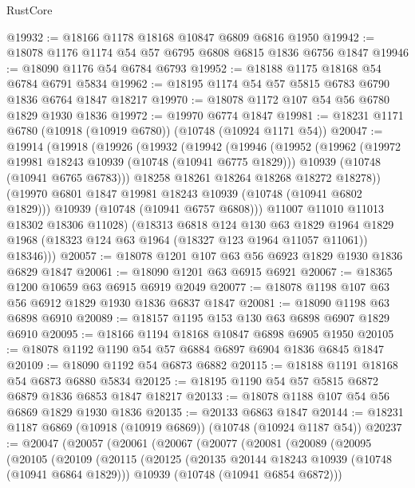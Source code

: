 \begin{lexlean}{RustCore}
\begin{coremodule}
@19932 := @18166 @1178 @18168 @10847 @6809 @6816 @1950
@19942 := @18078 @1176 @1174 @54 @57 @6795 @6808 @6815 @1836 @6756 @1847
@19946 := @18090 @1176 @54 @6784 @6793
@19952 := @18188 @1175 @18168 @54 @6784 @6791 @5834
@19962 := @18195 @1174 @54 @57 @5815 @6783 @6790 @1836 @6764 @1847 @18217
@19970 := @18078 @1172 @107 @54 @56 @6780 @1829 @1930 @1836
@19972 := @19970 @6774 @1847
@19981 := @18231 @1171 @6780 (@10918 (@10919 @6780)) (@10748 (@10924 @1171 @54))
@20047 := @19914
    (@19918
      (@19926
        (@19932
          (@19942
            (@19946
              (@19952
                (@19962
                  (@19972 @19981 @18243 @10939 (@10748 (@10941 @6775 @1829)))
                  @10939
                  (@10748 (@10941 @6765 @6783)))
                @18258
                @18261
                @18264
                @18268
                @18272
                @18278))
            (@19970 @6801 @1847 @19981 @18243 @10939 (@10748 (@10941 @6802 @1829)))
            @10939
            (@10748 (@10941 @6757 @6808)))
          @11007
          @11010
          @11013
          @18302
          @18306
          @11028)
        (@18313
          @6818
          @124
          @130
          @63
          @1829
          @1964
          @1829
          @1968
          (@18323 @124 @63 @1964 (@18327 @123 @1964 @11057 @11061))
          @18346)))
@20057 := @18078 @1201 @107 @63 @56 @6923 @1829 @1930 @1836 @6829 @1847
@20061 := @18090 @1201 @63 @6915 @6921
@20067 := @18365 @1200 @10659 @63 @6915 @6919 @2049
@20077 := @18078 @1198 @107 @63 @56 @6912 @1829 @1930 @1836 @6837 @1847
@20081 := @18090 @1198 @63 @6898 @6910
@20089 := @18157 @1195 @153 @130 @63 @6898 @6907 @1829 @6910
@20095 := @18166 @1194 @18168 @10847 @6898 @6905 @1950
@20105 := @18078 @1192 @1190 @54 @57 @6884 @6897 @6904 @1836 @6845 @1847
@20109 := @18090 @1192 @54 @6873 @6882
@20115 := @18188 @1191 @18168 @54 @6873 @6880 @5834
@20125 := @18195 @1190 @54 @57 @5815 @6872 @6879 @1836 @6853 @1847 @18217
@20133 := @18078 @1188 @107 @54 @56 @6869 @1829 @1930 @1836
@20135 := @20133 @6863 @1847
@20144 := @18231 @1187 @6869 (@10918 (@10919 @6869)) (@10748 (@10924 @1187 @54))
@20237 := @20047
    (@20057
      (@20061
        (@20067
          (@20077
            (@20081
              (@20089
                (@20095
                  (@20105
                    (@20109
                      (@20115
                        (@20125
                          (@20135 @20144 @18243 @10939 (@10748 (@10941 @6864 @1829)))
                          @10939
                          (@10748 (@10941 @6854 @6872)))

\end{coremodule}
\end{lexlean}
